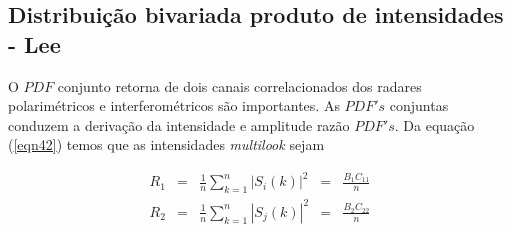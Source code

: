 

\subsection{Distribuição bivariada produto de intensidades - Lee } 

O $PDF$ conjunto retorna de dois canais correlacionados dos radares polarimétricos e interferométricos são importantes. As $PDF's$ conjuntas conduzem a derivação da intensidade e amplitude razão $PDF's$. Da equação (\ref{eqn42}) temos que as intensidades {\it multilook} sejam 

\begin{equation}\label{eqn59}
\begin{array}{ccccc}
	R_1&=&\frac{1}{n}\sum_{k=1}^{n}|S_i(k)|^2&=&\frac{B_1C_{11}}{n}\\
	R_2&=&\frac{1}{n}\sum_{k=1}^{n}|S_j(k)|^2&=&\frac{B_2C_{22}}{n}\\
\end{array}
\end{equation}

